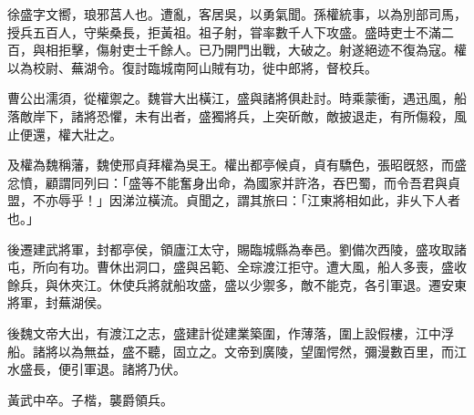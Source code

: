 \begin{pinyinscope}
 
 
 徐盛字文嚮，琅邪莒人也。遭亂，客居吳，以勇氣聞。孫權統事，以為別部司馬，授兵五百人，守柴桑長，拒黃祖。祖子射，甞率數千人下攻盛。盛時吏士不滿二百，與相拒擊，傷射吏士千餘人。已乃開門出戰，大破之。射遂絕迹不復為寇。權以為校尉、蕪湖令。復討臨城南阿山賊有功，徙中郎將，督校兵。
 
 
 
 
 曹公出濡須，從權禦之。魏甞大出橫江，盛與諸將俱赴討。時乘蒙衝，遇迅風，船落敵岸下，諸將恐懼，未有出者，盛獨將兵，上突斫敵，敵披退走，有所傷殺，風止便還，權大壯之。
 
 
 
 
 及權為魏稱藩，魏使邢貞拜權為吳王。權出都亭候貞，貞有驕色，張昭旣怒，而盛忿憤，顧謂同列曰：「盛等不能奮身出命，為國家并許洛，吞巴蜀，而令吾君與貞盟，不亦辱乎！」因涕泣橫流。貞聞之，謂其旅曰：「江東將相如此，非乆下人者也。」
 
 
 
 
 後遷建武將軍，封都亭侯，領廬江太守，賜臨城縣為奉邑。劉備次西陵，盛攻取諸屯，所向有功。曹休出洞口，盛與呂範、全琮渡江拒守。遭大風，船人多喪，盛收餘兵，與休夾江。休使兵將就船攻盛，盛以少禦多，敵不能克，各引軍退。遷安東將軍，封蕪湖侯。
 
 
 
 
 後魏文帝大出，有渡江之志，盛建計從建業築圍，作薄落，圍上設假樓，江中浮船。諸將以為無益，盛不聽，固立之。文帝到廣陵，望圍愕然，彌漫數百里，而江水盛長，便引軍退。諸將乃伏。
 
 
 
 
 
 
 黃武中卒。子楷，襲爵領兵。
 
 
\end{pinyinscope}